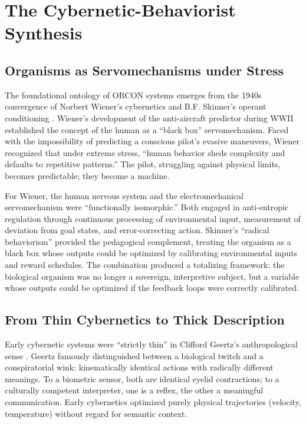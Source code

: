 \documentclass[11pt, a4paper]{article}
\begin{document}
\section{The Cybernetic-Behaviorist Synthesis}

\subsection{Organisms as Servomechanisms under Stress}
The foundational ontology of ORCON systems emerges from the 1940s convergence of Norbert Wiener's cybernetics \cite{wiener1948} and B.F. Skinner's operant conditioning \cite{skinner1938}. Wiener's development of the anti-aircraft predictor during WWII established the concept of the human as a ``black box'' servomechanism. Faced with the impossibility of predicting a conscious pilot's evasive maneuvers, Wiener recognized that under extreme stress, ``human behavior sheds complexity and defaults to repetitive patterns.'' The pilot, struggling against physical limits, becomes predictable; they become a machine.

For Wiener, the human nervous system and the electromechanical servomechanism were ``functionally isomorphic.'' Both engaged in anti-entropic regulation through continuous processing of environmental input, measurement of deviation from goal states, and error-correcting action. Skinner's ``radical behaviorism'' provided the pedagogical complement, treating the organism as a black box whose outputs could be optimized by calibrating environmental inputs and reward schedules. The combination produced a totalizing framework: the biological organism was no longer a sovereign, interpretive subject, but a variable whose outputs could be optimized if the feedback loops were correctly calibrated.

\subsection{From Thin Cybernetics to Thick Description}
Early cybernetic systems were ``strictly thin'' in Clifford Geertz's anthropological sense \cite{geertz1973}. Geertz famously distinguished between a biological twitch and a conspiratorial wink: kinematically identical actions with radically different meanings. To a biometric sensor, both are identical eyelid contractions; to a culturally competent interpreter, one is a reflex, the other a meaningful communication. Early cybernetics optimized purely physical trajectories (velocity, temperature) without regard for semantic context.
\end{document}
